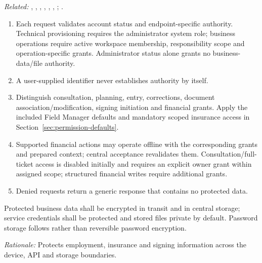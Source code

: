 \textit{Related:} \hyperref[fr:002]{}, \hyperref[fr:004]{}, \hyperref[fr:007]{}, \hyperref[fr:008]{}, \hyperref[fr:023]{}, \hyperref[fr:038]{}, \hyperref[fr:053]{}; \hyperref[br:024]{}.
\begin{enumerate}[label=(\alph*),leftmargin=*,itemsep=1pt,topsep=3pt]
\item Each request validates account status and endpoint-specific authority. Technical provisioning requires the administrator system role; business operations require active workspace membership, responsibility scope and operation-specific grants. Administrator status alone grants no business-data/file authority.
\item A user-supplied identifier never establishes authority by itself.
\item Distinguish consultation, planning, entry, corrections, document association/modification, signing initiation and financial grants. Apply the included Field Manager defaults and mandatory scoped insurance access in Section~\ref{sec:permission-defaults}.
\item Supported financial actions may operate offline with the corresponding grants and prepared context; central acceptance revalidates them. Consultation/full-ticket access is disabled initially and requires an explicit owner grant within assigned scope; structured financial writes require additional grants.
\item Denied requests return a generic response that contains no protected data.
\end{enumerate}

\label{nfr:SEC-04}
Protected business data shall be encrypted in transit and in central storage; service credentials shall be protected and stored files private by default. Password storage follows  rather than reversible password encryption.

\textit{Rationale:} Protects employment, insurance and signing information across the device, API and storage boundaries.

